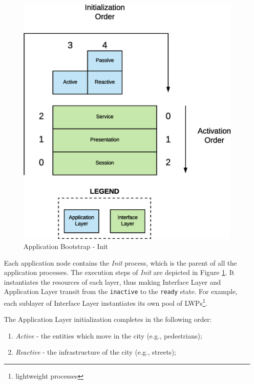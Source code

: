 \begin{figure}[H]
  \centering
  \includegraphics[scale=0.5,keepaspectratio]
    {images/solution/init_activate.eps}
  \caption{Application Bootstrap - Init}
  \label{fig:sd-app-init}
\end{figure}



Each application node contains the \textit{Init} process,
which is the parent of all the application processes.
The execution steps of \textit{Init} are depicted in Figure
\ref{fig:sd-app-init}.
It instantiates the resources of each layer, thus making
Interface Layer and Application Layer transit from the \verb|inactive|
to the \verb|ready| state.
For example, each sublayer of Interface Layer instantiates its own pool of
LWPs\footnote{lightweight processes}.

The Application Layer initialization completes in the following order:

\begin{enumerate}
  \item \textit{Active} - the entities which move in the city (e.g.,
    pedestrians);
  \item \textit{Reactive} - the infrastructure of the city (e.g., streets);
\end{enumerate}

